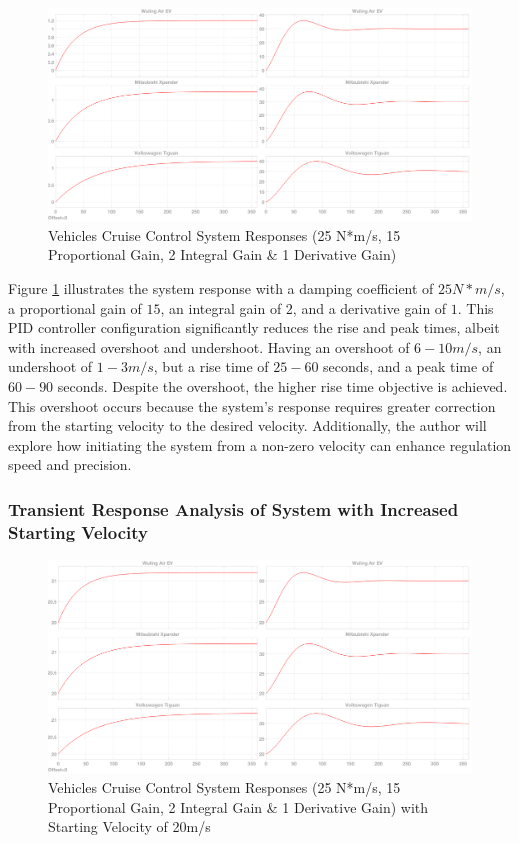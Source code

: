 \documentclass{article}
\begin{document}
\begin{figure}[htbp]
    \centering
    \includegraphics[width=1\linewidth]{img/15_PG_2_IG_1_DG.png}
    \caption{Vehicles Cruise Control System Responses (25 N*m/s, 15 Proportional Gain, 2 Integral Gain \& 1 Derivative Gain)}
    \label{fig:15pg2ig1dg}
\end{figure}

Figure \ref{fig:15pg2ig1dg} illustrates the system response with a damping coefficient of $25 N*m / s$, a proportional gain of $15$, an integral gain of $2$, and a derivative gain of $1$. This PID controller configuration significantly reduces the rise and peak times, albeit with increased overshoot and undershoot. Having an overshoot of $6 - 10 m/s$, an undershoot of $1 - 3 m/s$, but a rise time of $25 - 60$ seconds, and a peak time of $60 - 90$ seconds. Despite the overshoot, the higher rise time objective is achieved. This overshoot occurs because the system's response requires greater correction from the starting velocity to the desired velocity. Additionally, the author will explore how initiating the system from a non-zero velocity can enhance regulation speed and precision.

\subsubsection{Transient Response Analysis of System with Increased Starting Velocity}

\begin{figure}[htbp]
    \centering
    \includegraphics[width=1\linewidth]{img/20ms.png}
    \caption{Vehicles Cruise Control System Responses (25 N*m/s, 15 Proportional Gain, 2 Integral Gain \& 1 Derivative Gain) with Starting Velocity of 20m/s}
    \label{fig:20ms}
\end{figure}
\end{document}
